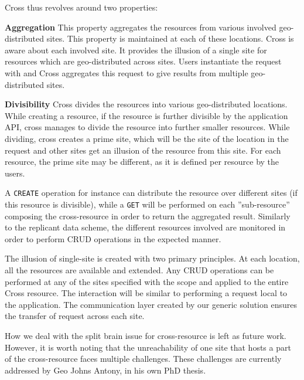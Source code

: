 Cross thus revolves around two properties:
  \begin{description}
  \item{\textbf{Aggregation}} This property aggregates the resources from
    various involved geo-distributed sites.
  This property is maintained at each of these locations.
  Cross is aware about each involved site.
  It provides the illusion of a single site for resources which are
  geo-distributed across sites.
  Users instantiate the request with \scl and Cross aggregates this
  request to give results from multiple geo-distributed sites.
\item{\textbf{Divisibility}} Cross divides the resources into various
  geo-distributed locations.
  While creating a resource, if the resource is further divisible by
  the application API, cross manages to divide the resource into
  further smaller resources.
  While dividing, cross creates a prime site, which will be the site
  of the location in the request and other sites get an illusion of
  the resource from this site.
  For each resource, the prime site may be different, as it is defined
  per resource by the users.
\end{description}


A \texttt{CREATE} operation for instance can distribute the resource
over different sites (if this resource is divisible), while a
\texttt{GET} will be performed on each ''sub-resource'' composing the
cross-resource in order to return the aggregated result.
%
Similarly to the replicant data scheme, the different resources
involved are monitored in order to perform CRUD operations in the
expected manner.
%

The illusion of single-site is created with two primary principles.
%
At each location, all the resources are available and extended.
%
Any CRUD operations can be performed at any of the sites specified
with the scope and applied to the entire Cross resource.
%
The interaction will be similar to performing a request local to the
application.
%
The communication layer created by our generic solution ensures the
transfer of request across each site.
%

How we deal with the split brain issue for cross-resource is left
as future work.
%
However, it is worth noting that the unreachability of one site that
hosts a part of the cross-resource faces multiple challenges.
%
These challenges are currently addressed by Geo Johns Antony, in his
own PhD thesis.




